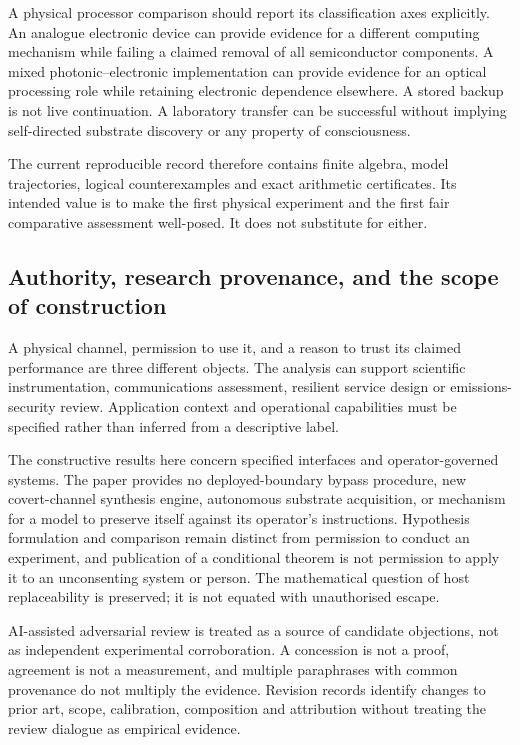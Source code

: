 \documentclass[11pt,a4paper]{article}
\theoremstyle{definition}
\theoremstyle{remark}
\begin{document}
A physical processor comparison should report its classification axes explicitly. An analogue electronic device can provide evidence for a different computing mechanism while failing a claimed removal of all semiconductor components. A mixed photonic--electronic implementation can provide evidence for an optical processing role while retaining electronic dependence elsewhere. A stored backup is not live continuation. A laboratory transfer can be successful without implying self-directed substrate discovery or any property of consciousness.

The current reproducible record therefore contains finite algebra, model trajectories, logical counterexamples and exact arithmetic certificates. Its intended value is to make the first physical experiment and the first fair comparative assessment well-posed. It does not substitute for either.


\subsection{Authority, research provenance, and the scope of construction}\label{sec:governance}
A physical channel, permission to use it, and a reason to trust its claimed performance are three different objects. The analysis can support scientific instrumentation, communications assessment, resilient service design or emissions-security review. Application context and operational capabilities must be specified rather than inferred from a descriptive label.

The constructive results here concern specified interfaces and operator-governed systems. The paper provides no deployed-boundary bypass procedure, new covert-channel synthesis engine, autonomous substrate acquisition, or mechanism for a model to preserve itself against its operator's instructions. Hypothesis formulation and comparison remain distinct from permission to conduct an experiment, and publication of a conditional theorem is not permission to apply it to an unconsenting system or person. The mathematical question of host replaceability is preserved; it is not equated with unauthorised escape.

AI-assisted adversarial review is treated as a source of candidate objections, not as independent experimental corroboration. A concession is not a proof, agreement is not a measurement, and multiple paraphrases with common provenance do not multiply the evidence. Revision records identify changes to prior art, scope, calibration, composition and attribution without treating the review dialogue as empirical evidence.
\end{document}
